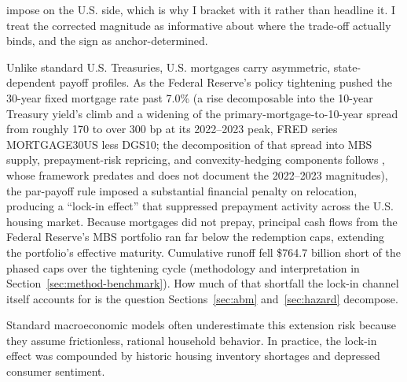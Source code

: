 \documentclass[12pt]{article}
\begin{document}
impose on the U.S. side, which is why I bracket with it rather than headline it. I treat the corrected magnitude as informative about where the trade-off actually binds, and the sign as anchor-determined.

Unlike standard U.S. Treasuries, U.S. mortgages carry asymmetric, state-dependent payoff profiles. As the Federal Reserve's policy tightening pushed the 30-year fixed mortgage rate past 7.0\% (a rise decomposable into the 10-year Treasury yield's climb and a widening of the primary-mortgage-to-10-year spread from roughly 170 to over 300 bp at its 2022--2023 peak, FRED series MORTGAGE30US less DGS10; the decomposition of that spread into MBS supply, prepayment-risk repricing, and convexity-hedging components follows \citet{boyarchenko2019}, whose framework predates and does not document the 2022--2023 magnitudes), the par-payoff rule imposed a substantial financial penalty on relocation, producing a ``lock-in effect'' that suppressed prepayment activity across the U.S. housing market. Because mortgages did not prepay, principal cash flows from the Federal Reserve's MBS portfolio ran far below the redemption caps, extending the portfolio's effective maturity. Cumulative runoff fell \$764.7 billion short of the phased caps over the tightening cycle (methodology and interpretation in Section~\ref{sec:method-benchmark}). How much of that shortfall the lock-in channel itself accounts for is the question Sections~\ref{sec:abm} and~\ref{sec:hazard} decompose.

Standard macroeconomic models often underestimate this extension risk because they assume frictionless, rational household behavior. In practice, the lock-in effect was compounded by historic housing inventory shortages and depressed consumer sentiment.
\end{document}
